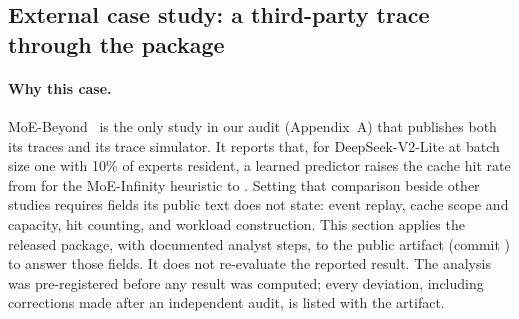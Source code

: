 \subsection{External case study: a third-party trace through the package}
\label{sec:case-study}

\paragraph{Why this case.}
MoE-Beyond~\cite{gavhane2025moebeyond} is the only study in our audit
(Appendix~A) that publishes both its traces and its trace simulator. It reports
that, for DeepSeek-V2-Lite at batch size one with 10\% of experts resident, a
learned predictor raises the cache hit rate from \CSreportedInfinity{} for the
MoE-Infinity heuristic to \CSreportedBeyond{}. Setting that comparison beside
other studies requires fields its public text does not state: event replay,
cache scope and capacity, hit counting, and workload construction. This section
applies the released package, with documented analyst steps, to the public
artifact (commit \texttt{\CSthirdPartyCommit}) to answer those fields. It does
not re-evaluate the reported result. The analysis was pre-registered before any
result was computed; every deviation, including corrections made after an
independent audit, is listed with the artifact.

